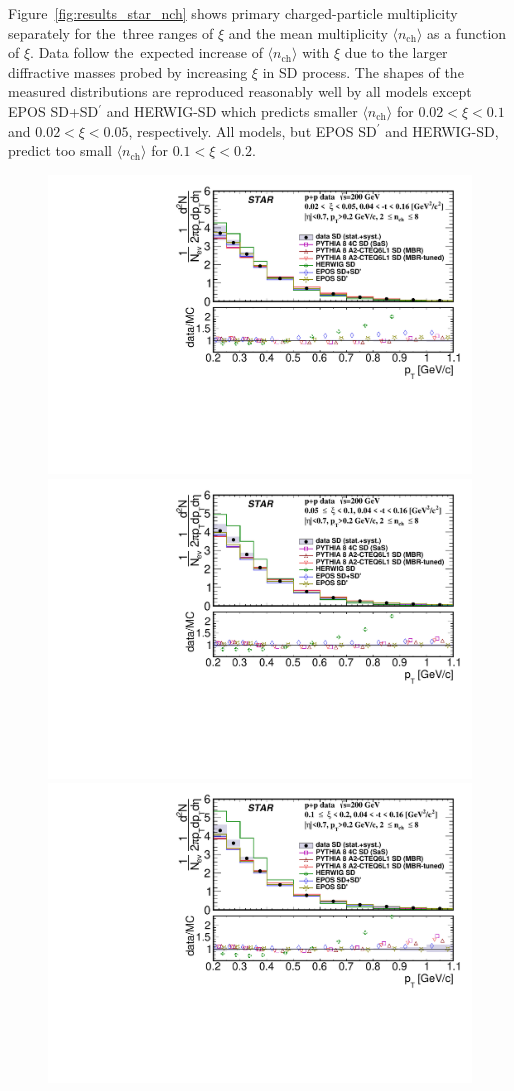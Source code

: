 Figure~\ref{fig:results_star_nch} shows primary charged-particle multiplicity  separately for the~three ranges of $\xi$ and the mean multiplicity $\langle n_\textrm{ch}\rangle$ as a function of $\xi$.  Data follow the~expected increase of  $\langle n_\textrm{ch}\rangle$ with $\xi$ due to the larger diffractive masses probed by increasing $\xi$ in SD process. The shapes of the measured distributions are reproduced reasonably well by all models except EPOS SD+SD$^\prime$ and HERWIG-SD which predicts  smaller $\langle n_\textrm{ch}\rangle$  for $0.02<\xi<0.1$  and $0.02<\xi<0.05$, respectively. All models, but EPOS SD$^\prime$ and HERWIG-SD, predict too small $\langle n_\textrm{ch}\rangle$ for $0.1<\xi<0.2$.

\begin{figure}[h!]
	\centering
	\includegraphics[width=.49\textwidth,page=1]{chapters/chrgSTAR/img/results/out_pt_ksi_0.pdf}
	\hfill
	\includegraphics[width=.49\textwidth,page=1]{chapters/chrgSTAR/img/results/out_pt_ksi_1.pdf}
	\newline
	\includegraphics[width=.49\textwidth,page=1]{chapters/chrgSTAR/img/results/out_pt_ksi_2.pdf}

\end{figure}
